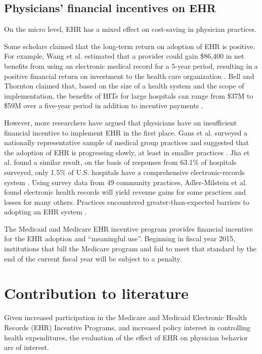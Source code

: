 \documentclass[12pt]{report}
\begin{document}
\subsection{Physicians' financial incentives on EHR}
On the micro level, EHR has a mixed effect on cost-saving in physician practices.

Some scholars claimed that the long-term return on adoption of EHR is positive. For example, Wang et al. estimated that a provider could gain \$86,400 in net benefits from using an electronic medical record for a 5-year period, resulting in a positive financial return on investment to the health care organization \citep{Wang2003}. Bell and Thornton claimed that, based on the size of a health system and the scope of implementation, the benefits of HITs for large hospitals can range from \$37M to \$59M over a five-year period in addition to incentive payments \citep{Bell2011}.

However, more researchers have argued that physicians have an insufficient financial incentive to implement EHR in the first place. Gans et al. surveyed a nationally representative sample of medical group practices and suggested that the adoption of EHR is progressing slowly, at least in smaller practices \citep{Gans2005}. Jha et al. found a similar result, on the basis of responses from 63.1\% of hospitals surveyed, only 1.5\% of U.S. hospitals have a comprehensive electronic-records system \citep{Jha2009}. Using survey data from 49 community practices, Adler-Milstein et al. found electronic health records will yield revenue gains for some practices and losses for many others. Practices encountered greater-than-expected barriers to adopting an EHR system \citep{Adler-Milstein2012}.

The Medicaid and Medicare EHR incentive program provides financial incentive for the EHR adoption and ``meaningful use''. Beginning in fiscal year 2015, institutions that bill the Medicare program and fail to meet that standard by the end of the current fiscal year will be subject to a penalty. 

\section{Contribution to literature}

Given increased participation in the Medicare and Medicaid Electronic Health Records (EHR) Incentive Programs, and increased policy interest in controlling health expenditures, the evaluation of the effect of EHR on physician behavior are of interest.
\end{document}
